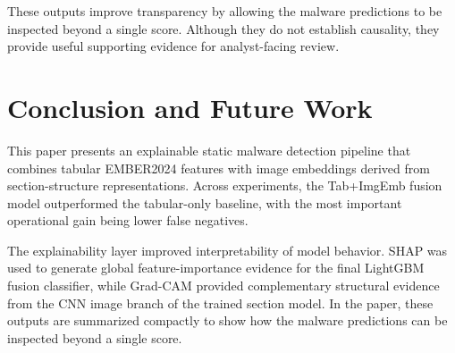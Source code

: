 \documentclass[conference]{IEEEtran}
\begin{document}
These outputs improve transparency by allowing the malware predictions to be inspected beyond a single score.
Although they do not establish causality, they provide useful supporting evidence for analyst-facing review.

% 

\section{Conclusion and Future Work}
\label{section:conclusion-and-futurework}

This paper presents an explainable static malware detection pipeline that combines tabular EMBER2024 features with image embeddings derived from section-structure representations.
Across experiments, the Tab+ImgEmb fusion model outperformed the tabular-only baseline, with the most important operational gain being lower false negatives.

The explainability layer improved interpretability of model behavior.
SHAP was used to generate global feature-importance evidence for the final LightGBM fusion classifier, while Grad-CAM provided complementary structural evidence from the CNN image branch of the trained section model.
In the paper, these outputs are summarized compactly to show how the malware predictions can be inspected beyond a single score.
\end{document}
